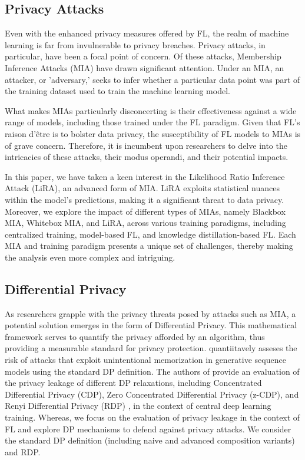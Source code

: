 \subsection{Privacy Attacks}

Even with the enhanced privacy measures offered by FL, the realm of machine learning is far from invulnerable to privacy breaches. Privacy attacks, in particular, have been a focal point of concern. Of these attacks, Membership Inference Attacks (MIA) have drawn significant attention. Under an MIA, an attacker, or 'adversary,' seeks to infer whether a particular data point was part of the training dataset used to train the machine learning model.

What makes MIAs particularly disconcerting is their effectiveness against a wide range of models, including those trained under the FL paradigm. Given that FL’s raison d'être is to bolster data privacy, the susceptibility of FL models to MIAs is of grave concern. Therefore, it is incumbent upon researchers to delve into the intricacies of these attacks, their modus operandi, and their potential impacts.

In this paper, we have taken a keen interest in the Likelihood Ratio Inference Attack (LiRA), an advanced form of MIA. LiRA exploits statistical nuances within the model's predictions, making it a significant threat to data privacy. Moreover, we explore the impact of different types of MIAs, namely Blackbox MIA, Whitebox MIA, and LiRA, across various training paradigms, including centralized training, model-based FL, and knowledge distillation-based FL. Each MIA and training paradigm presents a unique set of challenges, thereby making the analysis even more complex and intriguing.

\subsection{Differential Privacy}

As researchers grapple with the privacy threats posed by attacks such as MIA, a potential solution emerges in the form of Differential Privacy. This mathematical framework serves to quantify the privacy afforded by an algorithm, thus providing a measurable standard for privacy protection. \cite{carliniSecretSharerEvaluating2019} quantiitavely asseses the risk of attacks that exploit unintentional memorization in generative sequence models using the standard DP definition. The authors of \cite{EvaluatingDifferentiallyPrivate} provide an evaluation of the privacy leakage of different DP relaxations, including Concentrated Differential Privacy (CDP), Zero Concentrated Differential Privacy (z-CDP), and Renyi Differential Privacy (RDP) \cite{mironovRenyiDifferentialPrivacy2017}, in the context of central deep learning training. Whereas, we focus on the evaluation of privacy leakage in the context of FL and explore DP mechanisms to defend against privacy attacks. We consider the standard DP definition (including naive and advanced composition variants) and RDP.

